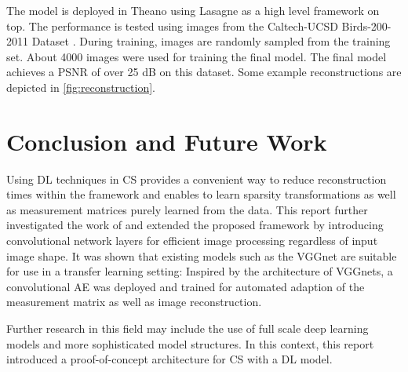 \documentclass[10pt,twocolumn,a4paper]{article}
\begin{document}
The model is deployed in Theano \cite{Bergstra2010} using Lasagne \cite{Dieleman2015} as a high level framework on top.
The performance is tested using images from the Caltech-UCSD Birds-200-2011 Dataset \cite{Wah2011}.
During training, images are randomly sampled from the training set.
About 4000 images were used for training the final model.
The final model achieves a PSNR of over 25 dB on this dataset.
Some example reconstructions are depicted in \autoref{fig:reconstruction}.


\section{Conclusion and Future Work}

Using DL techniques in CS provides a convenient way to reduce reconstruction times within the framework and enables to learn sparsity transformations as well as measurement matrices purely learned from the data.
This report further investigated the work of \cite{Mousavi2015} and extended the proposed framework by introducing convolutional network layers for efficient image processing regardless of input image shape.
It was shown that existing models such as the VGGnet are suitable for use in a transfer learning setting:
Inspired by the architecture of VGGnets, a convolutional AE was deployed and trained for automated adaption of the measurement matrix as well as image reconstruction.

Further research in this field may include the use of full scale deep learning models and more sophisticated model structures.
In this context, this report introduced a proof-of-concept architecture for CS with a DL model.


{\small


}
\end{document}

